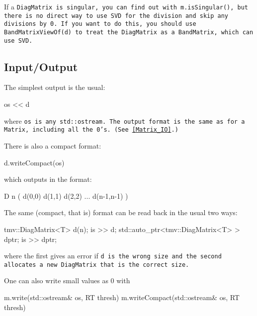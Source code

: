 If a \tt{DiagMatrix} is singular, you can find out with \tt{m.isSingular()},
but there is no direct way to use SVD for the division and skip any
divisions by 0.  If you want to do this, you should use \tt{BandMatrixViewOf(d)} to 
treat the \tt{DiagMatrix} as a \tt{BandMatrix}, which can use SVD.

\subsection{Input/Output}
\label{DiagMatrix_IO}

The simplest output is the usual:
\begin{tmvcode}
os << d
\end{tmvcode}
where \tt{os} is any \tt{std::ostream}.
The output format is the same as for a \tt{Matrix}, including all the 0's.
(See \ref{Matrix_IO}.)


There is also a compact format:
\begin{tmvcode}
d.writeCompact(os)
\end{tmvcode}
which outputs in the format:
\begin{tmvcode}
D n ( d(0,0)  d(1,1)  d(2,2)  ...  d(n-1,n-1) )
\end{tmvcode}

The same (compact, that is) format can be read back in the usual two ways:
\begin{tmvcode}
tmv::DiagMatrix<T> d(n);
is >> d;
std::auto_ptr<tmv::DiagMatrix<T> > dptr;
is >> dptr;
\end{tmvcode}
where the first gives an error if \tt{d} is the wrong size and the second allocates
a new \tt{DiagMatrix} that is the correct size.

One can also write small values as 0 with
\begin{tmvcode}
m.write(std::ostream& os, RT thresh)
m.writeCompact(std::ostream& os, RT thresh)
\end{tmvcode}
